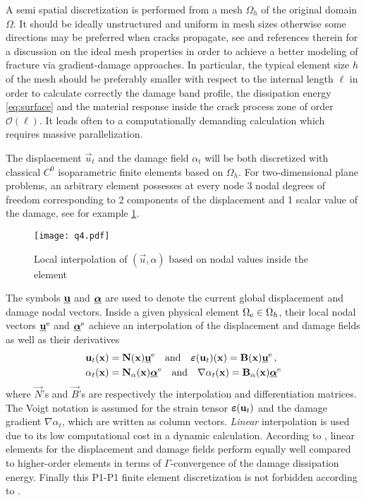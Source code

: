 A semi spatial discretization is performed from a mesh $\Omega_h$ of the original domain $\Omega$. It should be ideally unstructured and uniform in mesh sizes otherwise some directions may be preferred when cracks propagate, see \cite{Negri:1999,PhamAmorMarigoMaurini:2011} and references therein for a discussion on the ideal mesh properties in order to achieve a better modeling of fracture via gradient-damage approaches. In particular, the typical element size $h$ of the mesh should be preferably smaller with respect to the internal length $\ell$ in order to calculate correctly the damage band profile, the dissipation energy \eqref{eq:surface} and the material response inside the crack process zone of order $\mathcal{O}(\ell)$. It leads often to a computationally demanding calculation which requires massive parallelization.

The displacement $\vec{u}_t$ and the damage field $\alpha_t$ will be both discretized with classical $C^0$ isoparametric finite elements based on $\Omega_h$. For two-dimensional plane problems, an arbitrary element possesses at every node 3 nodal degrees of freedom corresponding to 2 components of the displacement and 1 scalar value of the damage, see for example \cref{fig:q4}.
\begin{figure}[htbp]
\centering
\texttt{[image: q4.pdf]}
\caption{Local interpolation of $(\vec{u},\alpha)$ based on nodal values inside the element} \label{fig:q4}
\end{figure}
The symbols $\uvec$ and $\dvec$ are used to denote the current global displacement and damage nodal vectors. Inside a given physical element $\Omega_{\mathrm{e}}\in\Omega_h$, their local nodal vectors $\uvec^\me$ and $\dvec^\me$ achieve an interpolation of the displacement and damage fields as well as their derivatives
\begin{equation} \label{eq:interpolation}
\begin{aligned}
& \vec{u}_t(\vec{x})=\vec{N}(\vec{x})\uvec^\me\quad\text{and}\quad\eps(\vec{u}_t)(\vec{x})=\vec{B}(\vec{x})\uvec^\me\, , \\
& \alpha_t(\vec{x})=\vec{N}_\alpha(\vec{x})\dvec^\me\quad\text{and}\quad\nabla\alpha_t(\vec{x})=\vec{B}_\alpha(\vec{x})\dvec^\me
\end{aligned}
\end{equation}
where $\vec{N}$'s and $\vec{B}$'s are respectively the interpolation and differentiation matrices. The Voigt notation is assumed for the strain tensor $\eps(\vec{u}_t)$ and the damage gradient $\nabla\alpha_t$, which are written as column vectors. \emph{Linear} interpolation is used due to its low computational cost in a dynamic calculation. According to \cite{BourdinFrancfortMarigo:2008}, linear elements for the displacement and damage fields perform equally well compared to higher-order elements in terms of $\Gamma$-convergence of the damage dissipation energy. Finally this P1-P1 finite element discretization is not forbidden according to \cite{SimoneAskesPeerlingsSluys:2003}.


